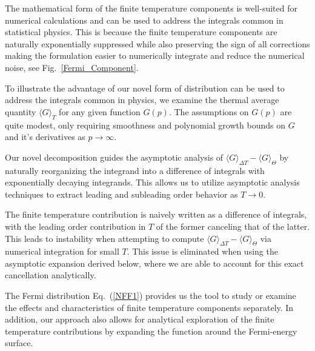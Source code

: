 \documentclass[sn-mathphys,Numbered]{sn-jnl}
\begin{document}
 
The mathematical form of the finite temperature components is well-suited for numerical calculations and can be used to address the integrals common in statistical physics. This is because the finite temperature components are naturally exponentially suppressed while also preserving the sign of all corrections making the formulation easier to numerically integrate and reduce the numerical noise, see Fig.~\ref{Fermi_Component}. 


To illustrate the advantage of our novel form of distribution can be used to address the integrals common in physics, we examine the thermal average quantity $\langle G\rangle_T$ for any given function $G(p)$. The assumptions on $G(p)$ are quite modest, only requiring smoothness and polynomial growth bounds on $G$ and it's derivatives as $p\to \infty$. 


Our novel decomposition guides the asymptotic analysis of $\langle G\rangle_{\Delta T}-\langle G\rangle_\Theta$ by naturally reorganizing the integrand into a difference of integrals with exponentially decaying integrands. This allows us to utilize asymptotic analysis techniques to   extract  leading and subleading order behavior as $T\to 0$. 

The finite temperature contribution is naively written as a difference of integrals, with the leading order contribution in $T$ of the former canceling that of the latter.  This leads to instability when attempting to compute $\langle G\rangle_{\Delta T}-\langle G\rangle_\Theta$ via numerical integration for small $T$.  This issue is eliminated when using the asymptotic expansion derived below, where we are able to account for this exact cancellation analytically. 

 
The Fermi distribution Eq.~(\ref{NFF1}) provides us the tool to study or examine the effects and characteristics of finite temperature components separately. In addition, our approach also allows for analytical exploration of the finite temperature contributions by expanding the function around the Fermi-energy surface.
\end{document}
